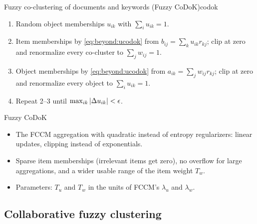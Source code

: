 \begin{algobox}{Fuzzy co-clustering of documents and keywords (Fuzzy CoDoK)}{codok}
\begin{enumerate}[leftmargin=*]
  \item Random object memberships $u_{ik}$ with $\sum_i u_{ik}=1$.
  \item Item memberships by \eqref{eq:beyond:ucodok} from $b_{ij}=\sum_k u_{ik}r_{kj}$; clip at zero and renormalize every co-cluster to $\sum_j w_{ij}=1$.
  \item Object memberships by \eqref{eq:beyond:ucodok} from $a_{ik}=\sum_j w_{ij}r_{kj}$; clip at zero and renormalize every object to $\sum_i u_{ik}=1$.
  \item Repeat 2--3 until $\max_{ik}\left\lvert \Delta u_{ik} \right\rvert<\epsilon$.
\end{enumerate}
\end{algobox}
\begin{summarybox}{Fuzzy CoDoK}
\begin{itemize}
  \item The FCCM aggregation with quadratic instead of entropy regularizers: linear updates, clipping instead of exponentials.
  \item Sparse item memberships (irrelevant items get zero), no overflow for large aggregations, and a wider usable range of the item weight $T_w$.
  \item Parameters: $T_u$ and $T_w$ in the units of FCCM's $\lambda_u$ and $\lambda_w$.
\end{itemize}
\end{summarybox}

\subsection{Collaborative fuzzy clustering}\label{sec:beyond:cfcm}

